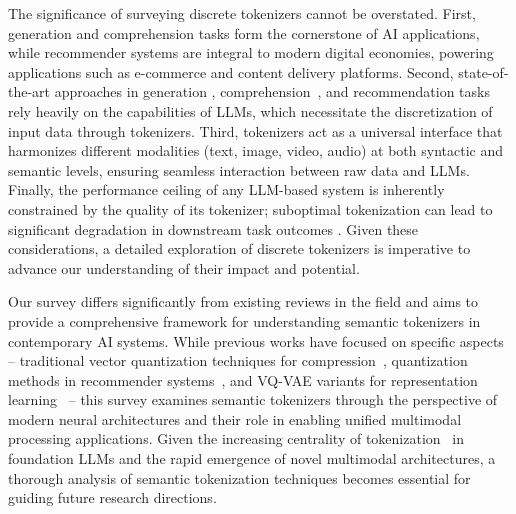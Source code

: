 The significance of surveying discrete tokenizers cannot be overstated. 
First, generation and comprehension tasks form the cornerstone of AI applications, while recommender systems are integral to modern digital economies, powering applications such as e-commerce and content delivery platforms. 
Second, state-of-the-art approaches in generation \cite{chen2024next}, comprehension~\cite{yang2023teal}, and recommendation tasks \cite{li2023large} rely heavily on the capabilities of LLMs, which necessitate the discretization of input data through tokenizers. 
Third, tokenizers act as a universal interface that harmonizes different modalities (text, image, video, audio) \cite{guo2025deepseek,tian2024visual,tan2024sweettokenizer,zhang2023speechtokenizer} at both syntactic and semantic levels, ensuring seamless interaction between raw data and LLMs. 
Finally, the performance ceiling of any LLM-based system is inherently constrained by the quality of its tokenizer; suboptimal tokenization can lead to significant degradation in downstream task outcomes \cite{yang2023teal,yu2023magvit-v2}. Given these considerations, a detailed exploration of discrete tokenizers is imperative to advance our understanding of their impact and potential.




Our survey differs significantly from existing reviews in the field and aims to provide a comprehensive framework for understanding semantic tokenizers in contemporary AI systems. While previous works have focused on specific aspects -- traditional vector quantization techniques for compression~\cite{wu2019vector}, quantization methods in recommender systems~\cite{liu2024vector}, and VQ-VAE variants for representation learning~\cite{zheng2023online} -- this survey examines semantic tokenizers through the perspective of modern neural architectures and their role in enabling unified multimodal processing applications. 
Given the increasing centrality of tokenization~\cite{wang2024tokenization} in foundation LLMs and the rapid emergence of novel multimodal architectures, a thorough analysis of semantic tokenization techniques becomes essential for guiding future research directions. 

